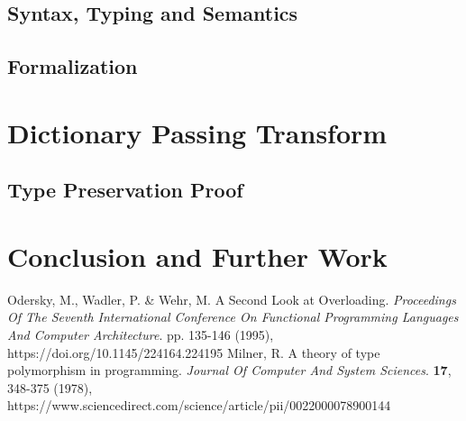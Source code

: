 \documentclass[runningheads]{llncs}
\begin{document}
\subsection{Syntax, Typing and Semantics}
\subsection{Formalization}
\section{Dictionary Passing Transform}
\subsection{Type Preservation Proof}
\section{Conclusion and Further Work}

\begin{thebibliography}{8}

Odersky, M., Wadler, P. \& Wehr, M. A Second Look at Overloading. 
{\em Proceedings Of The Seventh International Conference On Functional Programming Languages And Computer Architecture}. 
pp. 135-146 (1995), https://doi.org/10.1145/224164.224195
Milner, R. A theory of type polymorphism in programming. 
{\em Journal Of Computer And System Sciences}. 
\textbf{17}, 348-375 (1978), https://www.sciencedirect.com/science/article/pii/0022000078900144

\end{thebibliography}
\end{document}

